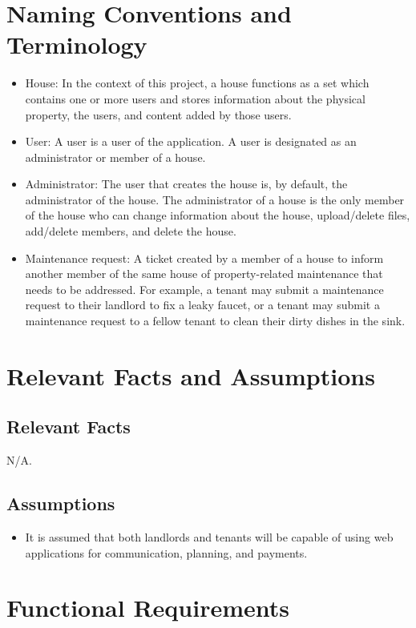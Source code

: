 \documentclass[12pt]{article}
\begin{document}
\section{Naming Conventions and Terminology}
    \begin{itemize}
    \item House: In the context of this project, a house functions as a set
      which contains one or more users and stores information about the
      physical property, the users, and content added by those users.
    \item User: A user is a user of the application. A user is designated as an administrator or member of a house.
    \item Administrator: The user that creates the house is, by default, the administrator of the house. The administrator of a house is the only member of the house who can change information about the house, upload/delete files, add/delete members, and delete the house.
    \item Maintenance request: A ticket created by a member of a house to inform another member of the same house of property-related maintenance that needs to be addressed. For example, a tenant may submit a maintenance request to their landlord to fix a leaky faucet, or a tenant may submit a maintenance request to a fellow tenant to clean their dirty dishes in the sink. 
    \end{itemize}

\section{Relevant Facts and Assumptions} 
\subsection{Relevant Facts}
N/A.
\subsection{Assumptions}
  \begin{itemize}
  \item  It is assumed that both landlords and tenants will be capable of using
    web applications for communication, planning, and payments.
  \end{itemize} 

\section{Functional Requirements} 
\end{document}
